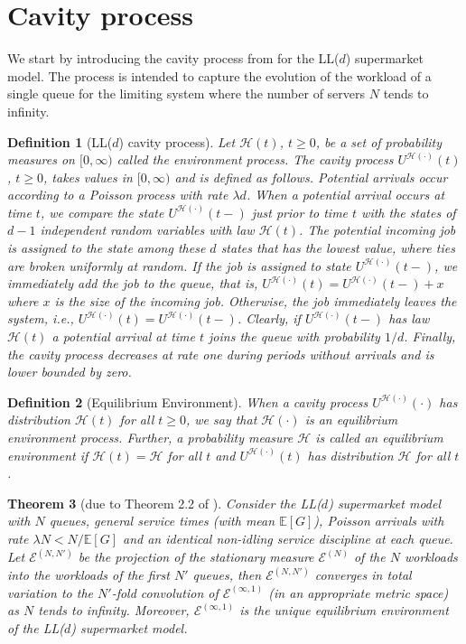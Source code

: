 \documentclass[12pt]{report}
\newcommand{\E}{\mathbb{E}}
\newtheorem{theorem}{Theorem}
\newtheorem{definition}[theorem]{Definition}
\begin{document}
\section{Cavity process}\label{sec:cavity_LLd}
We start by introducing the cavity process from \cite{bramsonLB} for the LL($d$) supermarket model. 
The  process is intended to capture the evolution
of the workload of a single queue for the limiting system where the number of servers $N$ tends to infinity.

\begin{definition}[LL($d$) cavity process]
Let $\mathcal{H}(t)$, $t \geq 0$, be a set of probability measures on $[0,\infty)$ called the {\it environment process}. 
The {\it cavity process} $U^{\mathcal{H}(\cdot)}(t)$, $t \geq 0$, takes values in $[0,\infty)$ and is defined as follows. 
Potential arrivals occur according to a Poisson process with rate $\lambda d$. When a potential arrival
occurs at time $t$, we compare the state $U^{\mathcal{H}(\cdot)}(t-)$ just prior to time $t$ with 
the states of $d-1$ independent random variables with law $\mathcal{H}(t)$.
The potential incoming job is assigned to the state among these $d$ states that has the lowest value, where ties are
broken uniformly at random. If the job is assigned to state $U^{\mathcal{H}(\cdot)}(t-)$, we immediately
add the job to the queue, that is, $U^{\mathcal{H}(\cdot)}(t)=U^{\mathcal{H}(\cdot)}(t-)+x$ where $x$ is the
size of the incoming job. Otherwise, the job immediately leaves the system, i.e., $U^{\mathcal{H}(\cdot)}(t)=U^{\mathcal{H}(\cdot)}(t-)$.
Clearly, if $U^{\mathcal{H}(\cdot)}(t-)$ has law  $\mathcal{H}(t)$ a potential arrival at time $t$ joins the queue
with probability $1/d$. Finally, the cavity process decreases at rate one during periods without arrivals and is lower
bounded by zero.
\end{definition}

\begin{definition}[Equilibrium Environment]
When a cavity process $U^{\mathcal{H}(\cdot)}(\cdot)$ has distribution 
$\mathcal{H}(t)$ for all $t \geq 0$, we say that $\mathcal{H}(\cdot)$ is an {\it equilibrium environment process}. 
Further, a probability measure $\mathcal{H}$ is called an {\it equilibrium environment} if 
$\mathcal{H}(t) = \mathcal{H}$ for all $t$ and $U^{\mathcal{H}(\cdot)}(t)$ has distribution $\mathcal{H}$ for all $t$.
\end{definition}

\begin{theorem}[due to Theorem 2.2 of \cite{bramson2012asymptotic}]\label{th:BLP}
Consider the LL($d$) supermarket model with $N$ queues, general service times (with mean $\E[G]$),
Poisson arrivals with rate $\lambda N < N/\E[G]$
and an identical non-idling service discipline at each queue. 
Let $\mathcal{E}^{(N,N')}$ be the projection of the stationary measure $\mathcal{E}^{(N)}$ of the $N$ workloads into the 
workloads of the first $N'$ queues,
then $\mathcal{E}^{(N,N')}$ converges in total variation to the $N'$-fold convolution of
$\mathcal{E}^{(\infty,1)}$ (in an appropriate metric space) as $N$ tends to infinity. 
Moreover, $\mathcal{E}^{(\infty,1)}$ is the unique equilibrium environment of the LL($d$) supermarket model.
\end{theorem}
\end{document}
